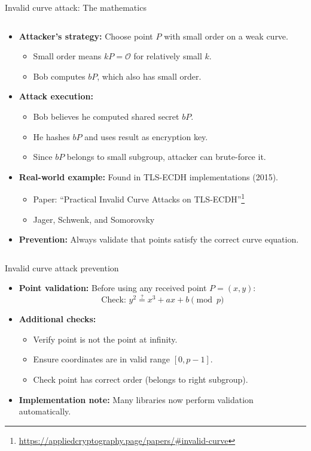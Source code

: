 \documentclass[aspectratio=169, lualatex, handout]{beamer}
\begin{document}
\begin{frame}{Invalid curve attack: The mathematics}
	\begin{columns}[c]
		\begin{column}{1\textwidth}
			\begin{itemize}[<+->]
				\item \textbf{Attacker's strategy:} Choose point $P$ with small order on a weak curve.
				      \begin{itemize}
					      \item Small order means $kP = \mathcal{O}$ for relatively small $k$.
					      \item Bob computes $bP$, which also has small order.
				      \end{itemize}
				\item \textbf{Attack execution:}
				      \begin{itemize}
					      \item Bob believes he computed shared secret $bP$.
					      \item He hashes $bP$ and uses result as encryption key.
					      \item Since $bP$ belongs to small subgroup, attacker can brute-force it.
				      \end{itemize}
				\item \textbf{Real-world example:} Found in TLS-ECDH implementations (2015).
				      \begin{itemize}
					      \item Paper: ``Practical Invalid Curve Attacks on TLS-ECDH''\footnote{\url{https://appliedcryptography.page/papers/\#invalid-curve}}
					      \item Jager, Schwenk, and Somorovsky
				      \end{itemize}
				\item \textbf{Prevention:} Always validate that points satisfy the correct curve equation.
			\end{itemize}
		\end{column}
	\end{columns}
\end{frame}

\begin{frame}{Invalid curve attack prevention}
	\begin{itemize}[<+->]
		\item \textbf{Point validation:} Before using any received point $P = (x, y)$:
		      $$\text{Check: } y^2 \stackrel{?}{=} x^3 + ax + b \pmod{p}$$
		\item \textbf{Additional checks:}
		      \begin{itemize}
			      \item Verify point is not the point at infinity.
			      \item Ensure coordinates are in valid range $[0, p-1]$.
			      \item Check point has correct order (belongs to right subgroup).
		      \end{itemize}
		\item \textbf{Implementation note:} Many libraries now perform validation automatically.
	\end{itemize}
\end{frame}
\end{document}
